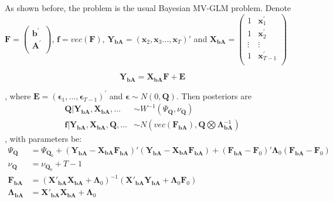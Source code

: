 \documentclass[]{article}
\begin{document}
As shown before, the problem is the usual Bayesian MV-GLM problem. Denote \(\mathbf{F} = \begin{pmatrix}
	\mathbf{b}^{'} \\
	\mathbf{A}^{'} \\
\end{pmatrix}\), \(\mathbf{f} = vec(\mathbf{F})\), \(\mathbf{Y}_\mathbf{bA} = (\mathbf{x}_{2}, \mathbf{x}_{3} \ldots, \mathbf{x}_{T})'\) and \(\mathbf{X}_\mathbf{bA} = \begin{pmatrix}
1 & \mathbf{x}_{1}^{'} \\
1 & \mathbf{x}_{2}^{'} \\
\vdots & \vdots \\
1 & \mathbf{x}_{T - 1}^{'} \\
\end{pmatrix}\)

\[\mathbf{Y}_\mathbf{bA} = \mathbf{X}_\mathbf{bA}\mathbf{F}+ \mathbf{E}\]

, where
\(\mathbf{E} = \left( \mathbf{\epsilon}_{1},\ldots,\mathbf{\epsilon}_{T - 1} \right)^{'}\) and \(\mathbf{\epsilon} \sim N(0,\mathbf{Q})\). Then posteriors are
\begin{align*}
	\mathbf{Q}|\mathbf{Y}_{\mathbf{bA}},\mathbf{X}_{\mathbf{bA}},\ldots &\sim W^{-1}(\Psi_{\mathbf{Q}}, \nu_{\mathbf{Q}})\\
	\mathbf{f}|\mathbf{Y}_{\mathbf{bA}},\mathbf{X}_{\mathbf{bA}},\mathbf{Q},\ldots &\sim N(vec(\mathbf{F}_\mathbf{bA}),  \mathbf{Q}\bigotimes \bm{\Lambda}_\mathbf{bA}^{-1})
\end{align*}
, with parameters be:
\begin{align*}
	\Psi_{\mathbf{Q}} &= \Psi_{\mathbf{Q}_{0}} + (\mathbf{Y}_\mathbf{bA} - \mathbf{X}_\mathbf{bA}\mathbf{F}_\mathbf{bA})'(\mathbf{Y}_\mathbf{bA} - \mathbf{X}_\mathbf{bA}\mathbf{F}_\mathbf{bA}) + (\mathbf{F}_\mathbf{bA} - \mathbf{F}_0)'\bm{\Lambda}_0(\mathbf{F}_\mathbf{bA} - \mathbf{F}_0)\\
	\nu_{\mathbf{Q}} &= \nu_{\mathbf{Q}_{0}} + T - 1\\
	\mathbf{F}_\mathbf{bA} &= (\mathbf{X}'_\mathbf{bA}\mathbf{X}_\mathbf{bA} + \bm{\Lambda}_0)^{-1}(\mathbf{X}'_\mathbf{bA}\mathbf{Y}_\mathbf{bA} + \bm{\Lambda}_0\mathbf{F}_0)\\
	\bm{\Lambda}_\mathbf{bA} &= \mathbf{X}'_\mathbf{bA}\mathbf{X}_\mathbf{bA} + \bm{\Lambda}_0
\end{align*}
\end{document}
